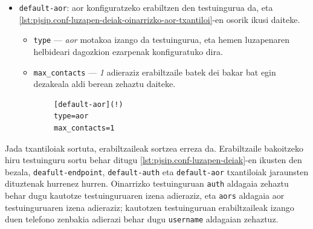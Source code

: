 \begin{itemize}
    \begin{listing}
        \begin{verbatim}
        [default-auth](!)
        type=auth
        auth_type=userpass
        password=unsecurepassword
        \end{verbatim}
        \caption{Luzapen telefonikoen oinarrizko sesio kautotzearen konfigurazio txantiloia deientzako pjsip.conf konfigurazio fitxategian}
        \label{lst:pjsip.conf-luzapen-deiak-oinarrizko-sesio-txantiloia}
    \end{listing}
    \item \texttt{default-aor}: \gls{aor} konfiguratzeko erabiltzen den testuingurua da, eta \autoref{lst:pjsip.conf-luzapen-deiak-oinarrizko-aor-txantiloi}-en osorik ikusi daiteke.
    \begin{itemize}
        \item \texttt{type} --- \textit{aor} motakoa izango da testuingurua, eta hemen luzapenaren helbideari dagozkion ezarpenak konfiguratuko dira.
        \item \texttt{max_contacts} --- \textit{1} adieraziz erabiltzaile batek dei bakar bat egin dezakeala aldi berean zehaztu daiteke.
    \end{itemize}
    \begin{listing}
        \begin{verbatim}
        [default-aor](!)
        type=aor
        max_contacts=1
        \end{verbatim}
        \caption{Luzapen telefonikoen oinarrizko \gls{aor} konfigurazio txantiloia deientzako pjsip.conf konfigurazio fitxategian}
        \label{lst:pjsip.conf-luzapen-deiak-oinarrizko-aor-txantiloi}
    \end{listing}
\end{itemize}

Jada txantiloiak sortuta, erabiltzaileak sortzea erreza da. Erabiltzaile bakoitzeko hiru testuinguru sortu behar ditugu \autoref{lst:pjsip.conf-luzapen-deiak}-en ikusten den bezala, \texttt{deafult-endpoint}, \texttt{default-auth} eta \texttt{default-aor} txantiloiak jaraunsten dituztenak hurrenez hurren. Oinarrizko testuinguruan \texttt{auth} aldagaia zehaztu behar dugu kautotze testuinguruaren izena adieraziz, eta \texttt{aors} aldagaia aor testuinguruaren izena adieraziz; kautotzen testuinguruan erabiltzaileak izango duen telefono zenbakia adierazi behar dugu \texttt{username} aldagaian zehaztuz.

